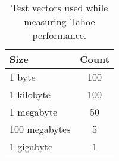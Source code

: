 \begin{table}[h]
  \centering
  \begin{tabular}{ | l | c | }
    \hline
    \textbf{Size} & \textbf{Count} \\ \hline
    1 byte & 100 \\ \hline
    1 kilobyte & 100 \\ \hline
    1 megabyte & 50 \\ \hline
    100 megabytes & 5 \\ \hline
    1 gigabyte & 1 \\ \hline
  \end{tabular}
  \caption{Test vectors used while measuring Tahoe performance.}
  \label{tbl:test_vectors}
\end{table}
